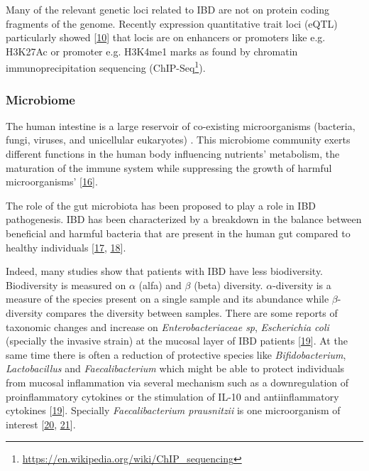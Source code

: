 \documentclass[
  a4paper,
]{book}
\DeclareRobustCommand{\href}[2]{#2\footnote{\url{#1}}}
\begin{document}
Many of the relevant genetic loci related to IBD are not on protein coding fragments of the genome.
Recently expression quantitative trait loci (eQTL) particularly showed {[}\protect\hyperlink{ref-mcgovern2015}{10}{]} that locis are on enhancers or promoters like e.g.
H3K27Ac or promoter e.g.
H3K4me1 marks as found by chromatin immunoprecipitation sequencing (\href{https://en.wikipedia.org/wiki/ChIP_sequencing}{ChIP-Seq}).

\hypertarget{microbiome}{%
\subsubsection{Microbiome}\label{microbiome}}

The human intestine is a large reservoir of co-existing microorganisms (bacteria, fungi, viruses, and unicellular eukaryotes) .
This microbiome community exerts different functions in the human body influencing nutrients' metabolism, the maturation of the immune system while suppressing the growth of harmful microorganisms' {[}\protect\hyperlink{ref-khanna2014}{16}{]}.

The role of the gut microbiota has been proposed to play a role in IBD pathogenesis.
IBD has been characterized by a breakdown in the balance between beneficial and harmful bacteria that are present in the human gut compared to healthy individuals {[}\protect\hyperlink{ref-swidsinski2002}{17}, \protect\hyperlink{ref-tamboli2004}{18}{]}.

Indeed, many studies show that patients with IBD have less biodiversity.
Biodiversity is measured on \(\alpha\) (alfa) and \(\beta\) (beta) diversity.
\(\alpha\)-diversity is a measure of the species present on a single sample and its abundance while \(\beta\)-diversity compares the diversity between samples.
There are some reports of taxonomic changes and increase on \emph{Enterobacteriaceae sp}, \emph{Escherichia coli} (specially the invasive strain) at the mucosal layer of IBD patients {[}\protect\hyperlink{ref-ott2004}{19}{]}.
At the same time there is often a reduction of protective species like \emph{Bifidobacterium}, \emph{Lactobacillus} and \emph{Faecalibacterium} which might be able to protect individuals from mucosal inflammation via several mechanism such as a downregulation of proinflammatory cytokines or the stimulation of IL-10 and antiinflammatory cytokines {[}\protect\hyperlink{ref-ott2004}{19}{]}.
Specially \emph{Faecalibacterium prausnitzii} is one microorganism of interest {[}\protect\hyperlink{ref-kostic2014}{20}, \protect\hyperlink{ref-sender2016}{21}{]}.
\end{document}
